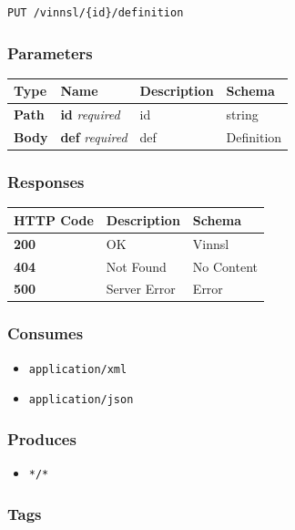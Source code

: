 \begin{verbatim}
PUT /vinnsl/{id}/definition
\end{verbatim}

\subsubsection{Parameters}\label{parameters-4}

\begin{longtable}[]{@{}llll@{}}
\toprule
Type & Name & Description & Schema\tabularnewline
\midrule
\endhead
\textbf{Path} & \textbf{id} \emph{required} & id & string\tabularnewline
\textbf{Body} & \textbf{def} \emph{required} & def &
Definition\tabularnewline
\bottomrule
\end{longtable}

\subsubsection{Responses}\label{responses-6}

\begin{longtable}[]{@{}lll@{}}
\toprule
HTTP Code & Description & Schema\tabularnewline
\midrule
\endhead
\textbf{200} & OK & Vinnsl\tabularnewline
\textbf{404} & Not Found & No Content\tabularnewline
\textbf{500} & Server Error & Error\tabularnewline
\bottomrule
\end{longtable}

\subsubsection{Consumes}\label{consumes-2}

\begin{itemize}
\tightlist
\item
  \texttt{application/xml}
\item
  \texttt{application/json}
\end{itemize}

\subsubsection{Produces}\label{produces-6}

\begin{itemize}
\tightlist
\item
  \texttt{*/*}
\end{itemize}

\subsubsection{Tags}\label{tags-6}

